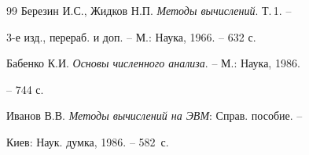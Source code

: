 \begin{thebibliography}{99}
Березин И.С., Жидков Н.П. {\em Методы вычислений}. Т.\,1. --


3-е изд., перераб. и доп. -- М.: Наука, 1966. -- 632 с.




Бабенко К.И. {\em Основы численного анализа}. -- М.: Наука, 1986.


-- 744 с.




Иванов В.В. {\em Методы вычислений на ЭВМ}: Справ. пособие. --


Киев: Наук. думка, 1986. -- 582~с.





\end{thebibliography}





\vskip 0.5cm











\label{end}






